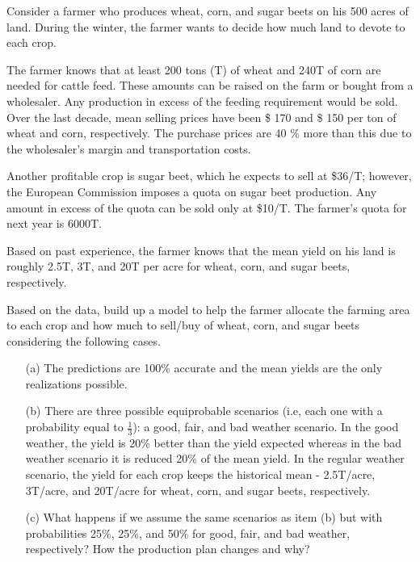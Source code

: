 Consider a farmer who produces wheat, corn, and sugar beets on his 500 acres of land. During the winter, the farmer wants to decide 
how much land to devote to each crop. 

The farmer knows that at least 200 tons (T) of wheat and 240T of corn are needed for cattle feed. 
These amounts can be raised on the farm or bought from a wholesaler. Any production in excess of the feeding requirement would be sold. Over the last decade, mean selling prices have been \$ 170 and \$ 150 per ton of wheat and corn, respectively. The purchase prices are 40 \% more than this due to the wholesaler's margin and transportation costs.

Another profitable crop is sugar beet, which he expects to sell at \$36/T; however, the European Commission imposes a quota on sugar beet 
production. Any amount in excess of the quota can be sold only at \$10/T. The farmer’s quota for next year is 6000T.

Based on past experience, the farmer knows that the mean yield on his land is
roughly 2.5T, 3T, and 20T per acre for wheat, corn, and sugar beets, respectively.

Based on the data, build up a model to help the farmer allocate the farming area to each crop and how much to sell/buy of wheat, corn, 
and sugar beets considering the following cases.

\begin{itemize}
	\item[(a)] The predictions are 100\% accurate and the mean yields are the only realizations possible.	
	\item[(b)] There are three possible equiprobable scenarios (i.e, each one with a probability equal to $\frac{1}{3}$): a good, fair, and bad weather scenario. In the good weather, the yield is 20\% better than the yield expected whereas in the bad weather scenario it is reduced 20\% of the mean yield. In the regular weather scenario, the yield for each crop keeps the historical mean - 2.5T/acre, 3T/acre, and 20T/acre for wheat, corn, and sugar beets, respectively.
	\item[(c)]	What happens if we assume the same scenarios as item (b) but with probabilities 25\%, 25\%, and 50\% for good, fair, and bad weather, respectively? How the production plan changes and why?	
\end{itemize}

